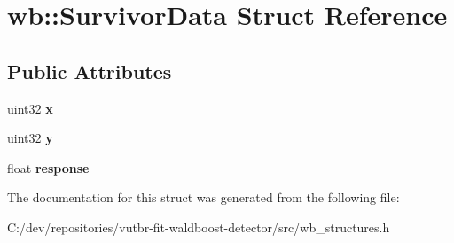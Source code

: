 \hypertarget{structwb_1_1_survivor_data}{}\section{wb\+:\+:Survivor\+Data Struct Reference}
\label{structwb_1_1_survivor_data}
\subsection*{Public Attributes}
\begin{DoxyCompactItemize}
\item 
\hypertarget{structwb_1_1_survivor_data_a332b2124ef31030c0926f39af55a9813}{}uint32 {\bfseries x}\label{structwb_1_1_survivor_data_a332b2124ef31030c0926f39af55a9813}

\item 
\hypertarget{structwb_1_1_survivor_data_aae20a4b74ebf68b84d3fec67dc8870e8}{}uint32 {\bfseries y}\label{structwb_1_1_survivor_data_aae20a4b74ebf68b84d3fec67dc8870e8}

\item 
\hypertarget{structwb_1_1_survivor_data_a95128ef84007dd7e5276afc4435b86bb}{}float {\bfseries response}\label{structwb_1_1_survivor_data_a95128ef84007dd7e5276afc4435b86bb}

\end{DoxyCompactItemize}


The documentation for this struct was generated from the following file\+:\begin{DoxyCompactItemize}
\item 
C\+:/dev/repositories/vutbr-\/fit-\/waldboost-\/detector/src/wb\+\_\+structures.\+h\end{DoxyCompactItemize}
